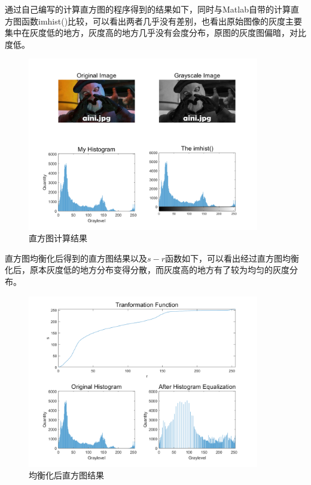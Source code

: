 \documentclass{../source/Experiment}
\begin{document}
        通过自己编写的计算直方图的程序得到的结果如下，同时与Matlab自带的计算直方图函数imhist()比较，可以看出两者几乎没有差别，也看出原始图像的灰度主要集中在灰度低的地方，灰度高的地方几乎没有会度分布，原图的灰度图偏暗，对比度低。
        \begin{figure}[H]
            \centering
            \includegraphics[width = 0.9\textwidth]{第一次/hw1-1.png}
            \caption{直方图计算结果}
        \end{figure}

        直方图均衡化后得到的直方图结果以及$s-r$函数如下，可以看出经过直方图均衡化后，原本灰度低的地方分布变得分散，而灰度高的地方有了较为均匀的灰度分布。
        \begin{figure}[H]
            \centering
            \includegraphics[width = 0.9\textwidth]{第一次/hw1-2.png}
            \caption{均衡化后直方图结果}
        \end{figure}
\end{document}
